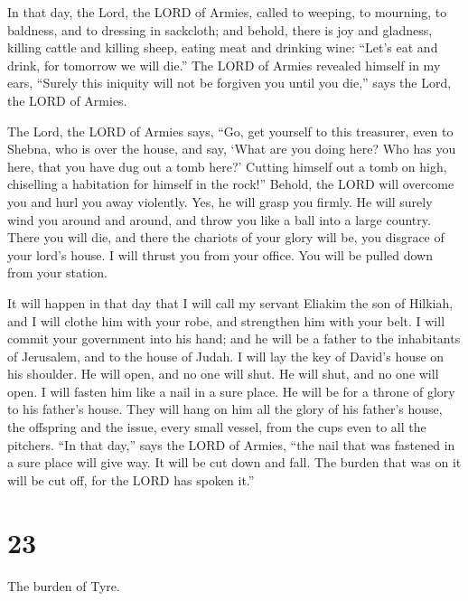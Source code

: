  In that day, the Lord, the LORD of Armies, called to
weeping, to mourning, to baldness, and to dressing in sackcloth;
 and behold, there is joy and gladness, killing cattle and
killing sheep, eating meat and drinking wine: ``Let's eat and drink, for
tomorrow we will die.''  The LORD of Armies revealed
himself in my ears, ``Surely this iniquity will not be forgiven you
until you die,'' says the Lord, the LORD of Armies.

 The Lord, the LORD of Armies says, ``Go, get yourself to
this treasurer, even to Shebna, who is over the house, and say,
 `What are you doing here? Who has you here, that you have
dug out a tomb here?' Cutting himself out a tomb on high, chiselling a
habitation for himself in the rock!''  Behold, the LORD
will overcome you and hurl you away violently. Yes, he will grasp you
firmly.  He will surely wind you around and around, and
throw you like a ball into a large country. There you will die, and
there the chariots of your glory will be, you disgrace of your lord's
house.  I will thrust you from your office. You will be
pulled down from your station.

 It will happen in that day that I will call my servant
Eliakim the son of Hilkiah,  and I will clothe him with
your robe, and strengthen him with your belt. I will commit your
government into his hand; and he will be a father to the inhabitants of
Jerusalem, and to the house of Judah.  I will lay the key
of David's house on his shoulder. He will open, and no one will shut. He
will shut, and no one will open.  I will fasten him like a
nail in a sure place. He will be for a throne of glory to his father's
house.  They will hang on him all the glory of his father's
house, the offspring and the issue, every small vessel, from the cups
even to all the pitchers.  ``In that day,'' says the LORD
of Armies, ``the nail that was fastened in a sure place will give way.
It will be cut down and fall. The burden that was on it will be cut off,
for the LORD has spoken it.''

\hypertarget{section-22}{%
\section{23}\label{section-22}}

 The burden of Tyre.

